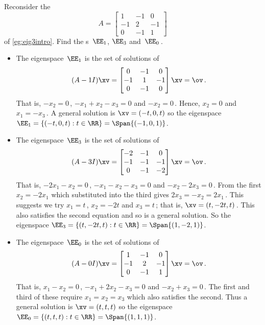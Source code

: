 \begin{example} \label{eg:eig3sp}
Reconsider the 
\begin{equation*}
A=\begin{bmatrix} 1&-1&0\\-1&2&-1\\0&-1&1 \end{bmatrix}
\end{equation*}
of \cref{eg:eig3intro}. 
Find the s~\(\EE_1\), \(\EE_3\) and~\(\EE_0\)\,.
\begin{solution} 
\begin{itemize}
\item The eigenspace~\(\EE_1\) is the set of solutions of
\begin{equation*}
(A-1I)\xv=\begin{bmatrix} 0&-1&0\\-1&1&-1\\0&-1&0 \end{bmatrix}
\xv=\ov\,.
\end{equation*}
That is, \(-x_2=0\)\,, \(-x_1+x_2-x_3=0\) and \(-x_2=0\)\,.
Hence, \(x_2=0\) and \(x_1=-x_3\)\,.
A general solution is \(\xv=(-t,0,t)\) so the eigenspace \(\EE_1=\{(-t,0,t) : t\in\RR\}=\Span\{(-1,0,1)\}\).

\item The eigenspace~\(\EE_3\) is the set of solutions of
\begin{equation*}
(A-3I)\xv=\begin{bmatrix} -2&-1&0\\-1&-1&-1\\0&-1&-2 \end{bmatrix}
\xv=\ov\,.
\end{equation*}
That is, \(-2x_1-x_2=0\)\,, \(-x_1-x_2-x_3=0\) and \(-x_2-2x_3=0\)\,.
From the first \(x_2=-2x_1\) which substituted into the third gives \(2x_3=-x_2=2x_1\)\,.  
This suggests we try \(x_1=t\)\,, \(x_2=-2t\) and \(x_3=t\)\,; that is, \(\xv=(t,-2t,t)\)\,.
This also satisfies the second equation and so is a general solution.
So the eigenspace \(\EE_3=\{(t,-2t,t) : t\in\RR\}=\Span\{(1,-2,1)\}\).

\item The eigenspace~\(\EE_0\) is the set of solutions of
\begin{equation*}
(A-0I)\xv=\begin{bmatrix} 1&-1&0\\-1&2&-1\\0&-1&1 \end{bmatrix}
\xv=\ov\,.
\end{equation*}
That is, \(x_1-x_2=0\)\,, \(-x_1+2x_2-x_3=0\) and \(-x_2+x_3=0\)\,.
The first and third of these require \(x_1=x_2=x_3\) which also satisfies the second.
Thus a general solution is \(\xv=(t,t,t)\) so the eigenspace \(\EE_0=\{(t,t,t) : t\in\RR\}=\Span\{(1,1,1)\}\). 
\end{itemize}
\end{solution}
\end{example}






